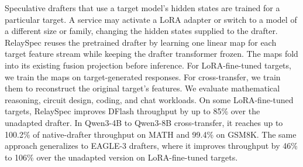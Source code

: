 Speculative drafters that use a target model's hidden states are trained for a particular target. A service may activate a LoRA adapter or switch to a model of a different size or family, changing the hidden states supplied to the drafter. RelaySpec reuses the pretrained drafter by learning one linear map for each target feature stream while keeping the drafter transformer frozen. The maps fold into its existing fusion projection before inference. For LoRA-fine-tuned targets, we train the maps on target-generated responses. For cross-transfer, we train them to reconstruct the original target's features. We evaluate mathematical reasoning, circuit design, coding, and chat workloads. On some LoRA-fine-tuned targets, RelaySpec improves DFlash throughput by up to 85\% over the unadapted drafter. In Qwen3-4B to Qwen3-8B cross-transfer, it reaches up to 100.2\% of native-drafter throughput on MATH and 99.4\% on GSM8K. The same approach generalizes to EAGLE-3 drafters, where it improves throughput by 46\% to 106\% over the unadapted version on LoRA-fine-tuned targets.
